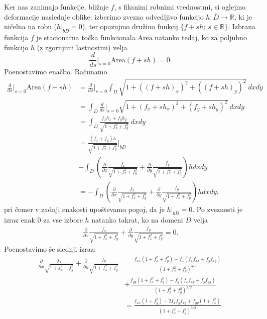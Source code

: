\documentclass[12pt,a4paper,twoside]{article}
\theoremstyle{definition} %
\theoremstyle{plain} %
\numberwithin{equation}{section}  %
\newcommand{\R}{\mathbb R}
\begin{document}
Ker nas zanimajo funkcije, bližnje $f$, s fiksnimi robnimi vrednostmi, si oglejmo deformacije naslednje oblike:
izberimo zvezno odvedljivo funkcijo $h \colon \overline{D} \to \R$, ki je ničelna na robu ($h|_{bD} = 0$), ter opazujmo družino funkcij $\{f + sh; \ s \in \R \}$.
Izbrana funkcija $f$ je stacionarna točka funkcionala $\text{Area}$ natanko tedaj, ko za poljubno funkcijo $h$ (z zgornjimi lastnostmi) velja
\begin{equation} \label{eq:stac-area(f+sh)}
\frac{d}{ds} \Big|_{s=0} \text{Area}(f+sh) = 0.
\end{equation}
Poenostavimo enačbo. Računamo
\begin{align*}
\frac{d}{ds} \Big|_{s=0} \text{Area}(f+sh) &= \frac{d}{ds} \Big|_{s=0} \int_{D} \sqrt{1 + ((f+sh)_{x})^2 + ((f+sh)_{y})^2} \ dxdy \\
	&= \int_{D} \frac{d}{ds} \Big|_{s=0} \sqrt{1 + (f_{x}+sh_{x})^2 + (f_{y}+sh_{y})^2} \ dxdy \\
	&= \int_{D} \frac{f_{x}h_{x} + f_{y}h_{y}}{\sqrt{1 + f_{x}^2 + f_{y}^2}} \ dxdy \\
	&= \frac{(f_{x} + f_{y})h}{\sqrt{1 + f_{x}^2 + f_{y}^2}} \Big|_{bD} \\
	&- \int_{D} \left( \frac{\partial}{\partial x} \frac{f_{x}}{\sqrt{1 + f_{x}^2 + f_{y}^2}} + \frac{\partial}{\partial y} \frac{f_{y}}{\sqrt{1 + f_{x}^2 + f_{y}^2}} \right) h dxdy \\
	&= - \int_{D} \left( \frac{\partial}{\partial x} \frac{f_{x}}{\sqrt{1 + f_{x}^2 + f_{y}^2}} + \frac{\partial}{\partial y} \frac{f_{y}}{\sqrt{1 + f_{x}^2 + f_{y}^2}} \right) h dxdy,
\end{align*}
pri čemer v zadnji enakosti upoštevamo pogoj, da je $h|_{bD}=0$.
Po zveznosti je izraz enak $0$ za vse izbore $h$ natanko takrat, ko na domeni $D$ velja
\begin{gather}
\frac{\partial}{\partial x} \frac{f_{x}}{\sqrt{1 + f_{x}^2 + f_{y}^2}} + \frac{\partial}{\partial y} \frac{f_{y}}{\sqrt{1 + f_{x}^2 + f_{y}^2}} = 0.
\end{gather}
Poenostavimo še slednji izraz:
\begin{align*}
\frac{\partial}{\partial x} \frac{f_{x}}{\sqrt{1 + f_{x}^2 + f_{y}^2}} + \frac{\partial}{\partial y} \frac{f_{y}}{\sqrt{1 + f_{x}^2 + f_{y}^2}}
	&= \frac{f_{xx}(1 + f_{x}^2 + f_{y}^2) - f_{x}(f_{x}f_{xx} + f_{y}f_{xy})}{(1 + f_{x}^2 + f_{y}^2)^{3/2}} \\
	&+ \frac{f_{yy}(1 + f_{x}^2 + f_{y}^2) - f_{y}(f_{x}f_{xy} + f_{y}f_{yy})}{(1 + f_{x}^2 + f_{y}^2)^{3/2}} \\
	&= \frac{f_{xx}(1+f_{y}^2) - 2f_{x}f_{y}f_{xy} + f_{yy}(1+f_{x}^2)}{(1 + f_{x}^2 + f_{y}^2)^{3/2}}.
\end{align*}
\end{document}
